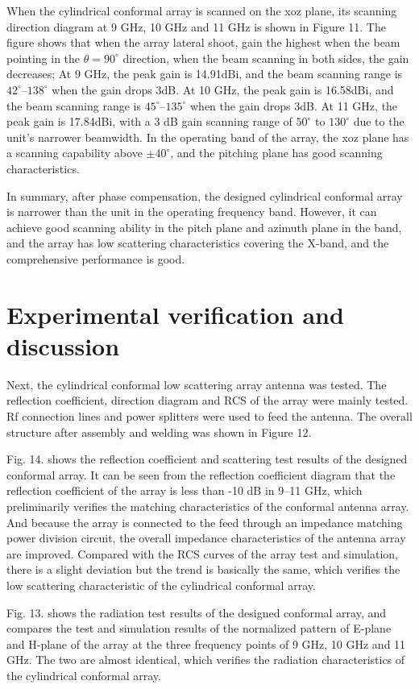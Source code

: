 \documentclass[USenglish]{article}
\theoremstyle{dgthm}
\theoremstyle{dgdef}
\begin{document}
When the cylindrical conformal array is scanned on the xoz plane, its scanning direction diagram at 9 GHz, 10 GHz and 11 GHz is shown in Figure 11. The figure shows that when the array lateral shoot, gain the highest when the beam pointing in the $\theta=90^\circ$ direction, when the beam scanning in both sides, the gain decreases; At 9 GHz, the peak gain is 14.91dBi, and the beam scanning range is $42^\circ$--$138^\circ$ when the gain drops 3dB. At 10 GHz, the peak gain is 16.58dBi, and the beam scanning range is $45^\circ$--$135^\circ$ when the gain drops 3dB. At 11 GHz, the peak gain is 17.84dBi, with a 3 dB gain scanning range of $50^\circ$ to $130^\circ$ due to the unit's narrower beamwidth. In the operating band of the array, the xoz plane has a scanning capability above $\pm40^\circ$, and the pitching plane has good scanning characteristics.


In summary, after phase compensation, the designed cylindrical conformal array is narrower than the unit in the operating frequency band. However, it can achieve good scanning ability in the pitch plane and azimuth plane in the band, and the array has low scattering characteristics covering the X-band, and the comprehensive performance is good.
\section{Experimental verification and discussion} 	
Next, the cylindrical conformal low scattering array antenna was tested. The reflection coefficient, direction diagram and RCS of the array were mainly tested. Rf connection lines and power splitters were used to feed the antenna. The overall structure after assembly and welding was shown in Figure 12.


Fig. 14. shows the reflection coefficient and scattering test results of the designed conformal array. It can be seen from the reflection coefficient diagram that the reflection coefficient of the array is less than -10 dB in 9--11 GHz, which preliminarily verifies the matching characteristics of the conformal antenna array. And because the array is connected to the feed through an impedance matching power division circuit, the overall impedance characteristics of the antenna array are improved. Compared with the RCS curves of the array test and simulation, there is a slight deviation but the trend is basically the same, which verifies the low scattering characteristic of the cylindrical conformal array.


Fig. 13. shows the radiation test results of the designed conformal array, and compares the test and simulation results of the normalized pattern of E-plane and H-plane of the array at the three frequency points of 9 GHz, 10 GHz and 11 GHz. The two are almost identical, which verifies the radiation characteristics of the cylindrical conformal array.
\end{document}
